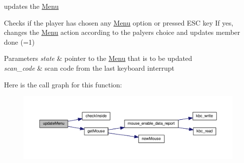 updates the \hyperlink{structMenu}{Menu} 

Checks if the player has chosen any \hyperlink{structMenu}{Menu} option or pressed E\+SC key If yes, changes the \hyperlink{structMenu}{Menu} action according to the palyer\textquotesingle{}s choice and updates member done (=1)


\begin{DoxyParams}{Parameters}
{\em state} & pointer to the \hyperlink{structMenu}{Menu} that is to be updated\\
\hline
{\em scan\+\_\+code} & scan code from the last keyboard interrupt \\
\hline
\end{DoxyParams}


Here is the call graph for this function\+:
\nopagebreak
\begin{figure}[H]
\begin{center}
\leavevmode
\includegraphics[width=350pt]{group__Menu_gab3392fb7e40877fd1ea754606fc9f8a1_cgraph}
\end{center}
\end{figure}


